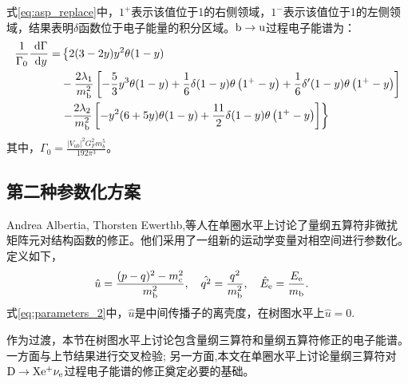     式\eqref{eq:asp_replace}中，$1^{+}$表示该值位于1的右侧领域，$1^{-}$表示该值位于1的左侧领域，结果表明$\delta$函数位于电子能量的积分区域。$\mathrm{b}\to\mathrm{u}$过程电子能谱为：
    \begin{equation}
        \begin{aligned}
        \frac{1}{\Gamma_0} \frac{\mathrm{~d} \Gamma}{\mathrm{~d} y}= & \left\{2(3-2 y) y^2 \theta(1-y)\right. \\
        & -\frac{2 \lambda_1}{m_{\mathrm{b}}^2}\left[-\frac{5}{3} y^3 \theta(1-y)+\frac{1}{6} \delta(1-y) \theta\left(1^{+}-y\right)+\frac{1}{6} \delta^{\prime}(1-y) \theta\left(1^{+}-y\right)\right] \\
        & \left.-\frac{2 \lambda_2}{m_{\mathrm{b}}^2}\left[-y^2(6+5 y) \theta(1-y)+\frac{11}{2} \delta(1-y) \theta\left(1^{+}-y\right)\right]\right\}
        \end{aligned}
        \end{equation}
    其中，$\Gamma_{0}=\frac{\left|V_{ub}\right|^2 G_F^2m_{b}^5}{192 \pi^3}$。
\subsection{第二种参数化方案}
    Andrea Albertia, Thorsten Ewerthb,等人在单圈水平上讨论了量纲五算符非微扰矩阵元对结构函数的修正。他们采用了一组新的运动学变量对相空间进行参数化。定义如下，
    \begin{equation}
            \hat{u}=\frac{(p-q)^2-m_{\mathrm{c}}^2}{m_{\mathrm{b}}^2},\quad
            \hat{q^2}=\frac{q^2}{m_{\mathrm{b}}^2},\quad
            \hat{E}_{\mathrm{e}}=\frac{E_{\mathrm{e}}}{m_{\mathrm{b}}}.\quad
        \label{eq:parameters_2}
    \end{equation}
    式\eqref{eq:parameters_2}中，$\hat{u}$是中间传播子的离壳度，在树图水平上$\hat{u}=0$.
    
    作为过渡，本节在树图水平上讨论包含量纲三算符和量纲五算符修正的电子能谱。一方面与上节结果进行交叉检验; 另一方面,本文在单圈水平上讨论量纲三算符对$\mathrm{D\to X e^{+}\nu_e}$过程电子能谱的修正奠定必要的基础。

